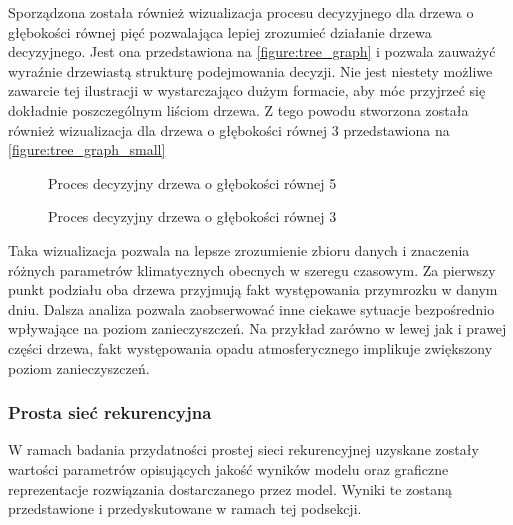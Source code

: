 \documentclass[10pt,a4paper]{article}
\begin{document}
Sporządzona została również wizualizacja procesu decyzyjnego dla drzewa o głębokości równej pięć pozwalająca lepiej zrozumieć działanie drzewa decyzyjnego. Jest ona przedstawiona na \autoref{figure:tree_graph} i pozwala zauważyć wyraźnie drzewiastą strukturę podejmowania decyzji. Nie jest niestety możliwe zawarcie tej ilustracji w wystarczająco dużym formacie, aby móc przyjrzeć się dokładnie poszczególnym liściom drzewa. Z tego powodu stworzona została również wizualizacja dla drzewa o głębokości równej 3 przedstawiona na \autoref{figure:tree_graph_small}
\begin{figure}[!ht]
	\centering
	\caption{Proces decyzyjny drzewa o głębokości równej 5}
	\label{figure:tree_graph}
\end{figure}
\FloatBarrier
\begin{figure}[!ht]
	\centering
	\caption{Proces decyzyjny drzewa o głębokości równej 3}
	\label{figure:tree_graph_small}
\end{figure}
\FloatBarrier
Taka wizualizacja pozwala na lepsze zrozumienie zbioru danych i znaczenia różnych parametrów klimatycznych obecnych w szeregu czasowym. Za pierwszy punkt podziału oba drzewa przyjmują fakt występowania przymrozku w danym dniu. Dalsza analiza pozwala zaobserwować inne ciekawe sytuacje bezpośrednio wpływające na poziom zanieczyszczeń. Na przykład zarówno w lewej jak i prawej części drzewa, fakt występowania opadu atmosferycznego implikuje zwiększony poziom zanieczyszczeń. 

\subsubsection{Prosta sieć rekurencyjna}
W ramach badania przydatności prostej sieci rekurencyjnej uzyskane zostały wartości parametrów opisujących jakość wyników modelu oraz graficzne reprezentacje rozwiązania dostarczanego przez model. Wyniki te zostaną przedstawione i przedyskutowane w ramach tej podsekcji.
\end{document}
